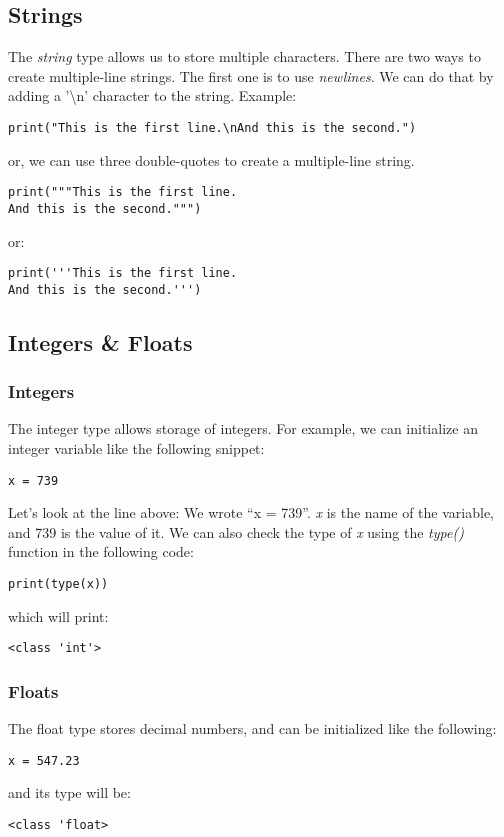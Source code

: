 \subsection*{Strings}
\label{subsec:strings}
The \emph{string} type allows us to store multiple characters.
There are two ways to create multiple-line strings. The first one is to use \emph{newlines}.
We can do that by adding a '\textbackslash{n}' character to the string.
Example:
\begin{lstlisting}
print("This is the first line.\nAnd this is the second.")
\end{lstlisting}
or, we can use three double-quotes to create a multiple-line string.
\begin{lstlisting}
print("""This is the first line.
And this is the second.""")
\end{lstlisting}
or:
\begin{lstlisting}
print('''This is the first line.
And this is the second.''')
\end{lstlisting}
\subsection*{Integers \& Floats}
\subsubsection*{Integers}
The integer type allows storage of integers.
For example, we can initialize an integer variable like the following snippet:
\begin{lstlisting}
x = 739
\end{lstlisting}
Let's look at the line above: We wrote ``x = 739''. \emph{x} is the name of the variable, and 739 is the value of it.
We can also check the type of \emph{x} using the \emph{type()} function in the following code:
\begin{lstlisting}
print(type(x))
\end{lstlisting}
which will print:
\begin{lstlisting}[language=Text]
<class 'int'>
\end{lstlisting}
\subsubsection*{Floats}
The float type stores decimal numbers, and can be initialized like the following:
\begin{lstlisting}
x = 547.23
\end{lstlisting}
and its type will be:
\begin{lstlisting}[language=Text]
<class 'float>
\end{lstlisting}

